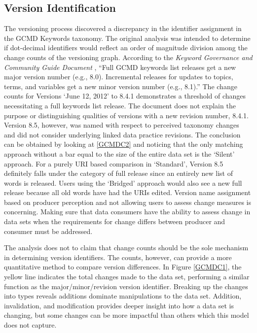 \subsection{Version Identification}

The versioning process discovered a discrepancy in the identifier assignment in the GCMD Keywords taxonomy.
The original analysis was intended to determine if dot-decimal identifiers would reflect an order of magnitude division among the change counts of the versioning graph.
According to the \textit{Keyword Governance and Community Guide Document} \cite{gcmd_gov}, ``Full GCMD keywords list releases get a new major version number (e.g., 8.0). Incremental releases for updates to topics, terms, and variables get a new minor version number (e.g., 8.1).”
The change counts for Versions `June 12, 2012' to 8.4.1 demonstrates a threshold of changes necessitating a full keywords list release.
The document does not explain the purpose or distinguishing qualities of versions with a new revision number, 8.4.1.
Version 8.5, however, was named with respect to perceived taxonomy changes and did not consider underlying linked data practice revisions.
The conclusion can be obtained by looking at \ref{GCMDC2} and noticing that the only matching approach without a bar equal to the size of the entire data set is the `Silent' approach.
For a purely URI based comparison in `Standard', Version 8.5 definitely falls under the category of full release since an entirely new list of words is released.
Users using the `Bridged' approach would also see a new full release because all old words have had the URIs edited.
Version name assignment based on producer perception and not allowing users to assess change measures is concerning.
Making sure that data consumers have the ability to assess change in data sets when the requirements for change differs between producer and consumer must be addressed.

The analysis does not to claim that change counts should be the sole mechanism in determining version identifiers.
The counts, however, can provide a more quantitative method to compare version differences.
In Figure \ref{GCMDC1}, the yellow line indicates the total changes made to the data set, performing a similar function as the major/minor/revision version identifier.
Breaking up the changes into types reveals additions dominate manipulations to the data set.
Addition, invalidation, and modification provides deeper insight into how a data set is changing, but some changes can be more impactful than others which this model does not capture.

